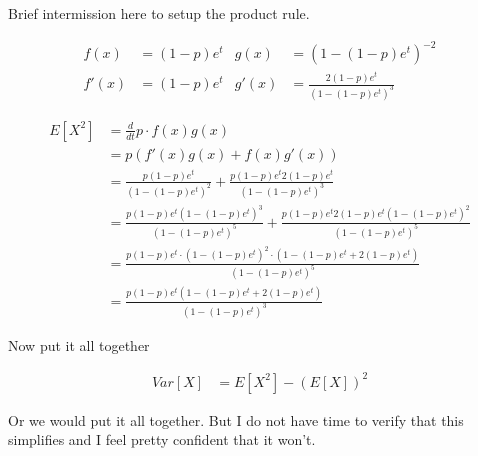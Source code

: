 Brief intermission here to setup the product rule.

\begin{align*}
	f(x) &= (1-p)e^t & g(x) &= (1-(1-p)e^t)^{-2} \\
	f'(x) &= (1-p)e^t & g'(x) &= \frac{2(1-p)e^t}{(1-(1-p)e^t)^3}
\end{align*}

\begin{align*}
	E[X^2] &= \frac{d}{dt} p \cdot f(x) g(x) \\
	&= p(f'(x)g(x) + f(x)g'(x)) \\
	&= \frac{p(1-p)e^t}{(1-(1-p)e^t)^2} + \frac{p(1-p)e^t2(1-p)e^t}{(1-(1-p)e^t)^3} \\
	&= \frac{p(1-p)e^t(1-(1-p)e^t)^3}{(1-(1-p)e^t)^5} + \frac{p(1-p)e^t 2(1-p)e^t (1-(1-p)e^t)^2}{(1-(1-p)e^t)^5} \\
	&= \frac{p(1-p)e^t \cdot (1-(1-p)e^t)^2 \cdot (1-(1-p)e^t + 2(1-p)e^t)}{(1-(1-p)e^t)^5} \\
	&= \frac{p(1-p)e^t \left( 1-(1-p)e^t + 2(1-p)e^t \right)}{(1-(1-p)e^t)^3}
\end{align*}

Now put it all together

\begin{align*}
	Var[X] &= E[X^2] - (E[X])^2
\end{align*}

Or we would put it all together. But I do not have time to verify that this simplifies and I feel pretty confident that it won't. 
